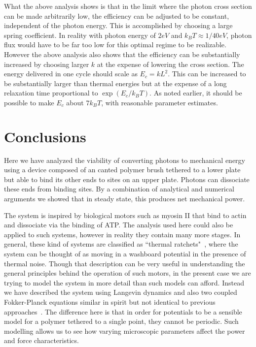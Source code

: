 \documentclass[journal = mamobx, manuscript = article]{achemso}
\begin{document}
What the above analysis shows is that in the limit where the photon cross section can be made arbitrarily low, the efficiency 
can be adjusted to be constant, independent of the photon energy. This is
accomplished by choosing a large spring coefficient. In reality
with photon energy of $2 eV$ and $k_B T \approx 1/40 eV$, photon flux would have
to be far too low for this optimal regime to be realizable. However the
above analysis also shows that the efficiency can be substantially increased by
choosing larger $k$ at the expense of lowering the cross section. The energy
delivered in one cycle should scale as $E_c = k L^2$. This can be increased to
be substantially larger than thermal energies but at the expense of a long
relaxation time proportional to $\exp(E_c/k_B T)$. As noted earlier, it should
be possible to make $E_c$ about $7 k_B T$, with reasonable parameter estimates. 

\section{Conclusions}
\label{sec:Conclusions}
Here we have analyzed the viability of converting photons to mechanical
energy using a device composed of an canted polymer brush tethered to a
lower plate but able to bind its other ends to sites on an upper plate. Photons can dissociate
these ends from binding sites. By a combination of analytical and numerical arguments we showed
that in steady state, this produces net mechanical power.

The system is inspired by biological motors such as myosin II that bind
to actin and dissociate via the binding of ATP. The analysis used here
could also be applied to such systems, however in reality they contain
many more stages. In general, these kind of systems are classified as 
``thermal ratchets"~\cite{ReimannRev}, where the system can be thought of as moving in a
washboard potential in the presence of thermal noise. Though that description
can be very useful in understanding the general principles behind
the operation of such motors, in the present case we are trying to model
the system in more detail than such models can afford. Instead we have described
the system using Langevin dynamics and also two coupled Fokker-Planck equations similar
in spirit but not identical to previous approaches~\cite{ProstPRL,BustamanteKellerOster}. The difference
here is that in order for potentials to be a sensible model for a polymer tethered
to a single point, they cannot be periodic. Such modelling allows us to
see how varying microscopic parameters affect the power and force
characteristics. 
\end{document}
